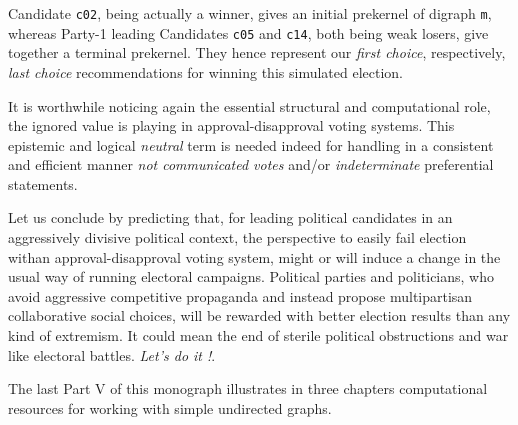 Candidate \texttt{c02}, being actually a \Condorcet winner, gives an initial prekernel of digraph \texttt{m}, whereas Party-1 leading Candidates \texttt{c05} and \texttt{c14}, both being weak \Condorcet losers, give together a terminal prekernel. They hence represent our \emph{first choice}, respectively, \emph{last choice} recommendations for winning this simulated election.

It is worthwhile noticing again the essential structural and computational role, the ignored value is playing in approval-disapproval voting systems. This epistemic and logical \emph{neutral} term is needed indeed for handling in a consistent and efficient manner \emph{not communicated votes} and/or \emph{indeterminate} preferential statements.

Let us conclude by predicting that, for leading political candidates in an aggressively divisive political context, the perspective to easily fail election withan approval-disapproval voting system, might or will induce a change in the usual way of running electoral campaigns. Political parties and politicians, who avoid aggressive competitive propaganda and instead propose multipartisan collaborative social choices, will be rewarded with better election results than any kind of extremism. It could mean the end of sterile political obstructions and war like electoral battles. \emph{Let's do it !}.

\vspace{\baselineskip}
The last Part V of this monograph illustrates in three chapters computational resources for working with simple undirected graphs.

{}
{}

%
%
